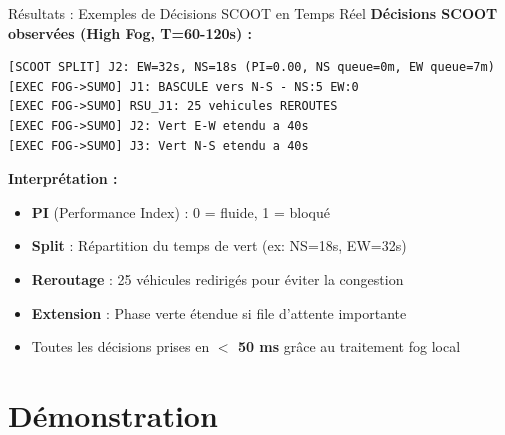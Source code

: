 \documentclass[10pt,aspectratio=169]{beamer}
\begin{document}
\begin{frame}[fragile]{R\'esultats : Exemples de D\'ecisions SCOOT en Temps R\'eel}
\textbf{D\'ecisions SCOOT observ\'ees (High Fog, T=60-120s) :}

\begin{lstlisting}[style=bash]
[SCOOT SPLIT] J2: EW=32s, NS=18s (PI=0.00, NS queue=0m, EW queue=7m)
[EXEC FOG->SUMO] J1: BASCULE vers N-S - NS:5 EW:0
[EXEC FOG->SUMO] RSU_J1: 25 vehicules REROUTES
[EXEC FOG->SUMO] J2: Vert E-W etendu a 40s
[EXEC FOG->SUMO] J3: Vert N-S etendu a 40s
\end{lstlisting}

\vspace{0.2cm}
\textbf{Interpr\'etation :}
\begin{itemize}
    \item \textbf{PI} (Performance Index) : 0 = fluide, 1 = bloqu\'e
    \item \textbf{Split} : R\'epartition du temps de vert (ex: NS=18s, EW=32s)
    \item \textbf{Reroutage} : 25 v\'ehicules redirig\'es pour \'eviter la congestion
    \item \textbf{Extension} : Phase verte \'etendue si file d'attente importante
    \item Toutes les d\'ecisions prises en \textbf{$<$ 50 ms} gr\^ace au traitement fog local
\end{itemize}
\end{frame}

\section{D\'emonstration}
\end{document}
